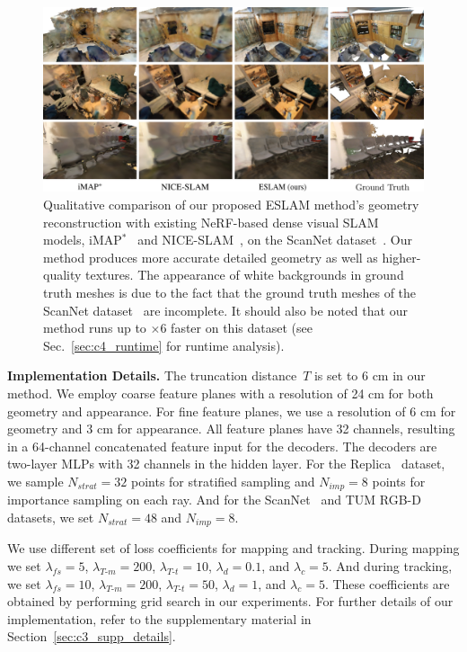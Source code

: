 \begin{figure}[t]
    \begin{center}
        \includegraphics[width=1.0\linewidth]{images/chapter4/figures/Fig5.jpg}
    \end{center}
    \caption{Qualitative comparison of our proposed ESLAM method's geometry reconstruction with existing NeRF-based dense visual SLAM models, iMAP$^*$~\citep{sucar2021imap} and NICE-SLAM~\citep{zhu2022nice}, on the ScanNet dataset~\citep{dai2017scannet}. Our method produces more accurate detailed geometry as well as higher-quality textures. The appearance of white backgrounds in ground truth meshes is due to the fact that the ground truth meshes of the ScanNet dataset~\citep{dai2017scannet} are incomplete. It should also be noted that our method runs up to $\times$6 faster on this dataset (see Sec.~\ref{sec:c4_runtime} for runtime analysis).}
    \label{fig:c4_qualitative_scannet}
\end{figure}

\vspace{1ex}
\noindent\textbf{Implementation Details.} The truncation distance~$T$ is set to 6 cm in our method. We employ coarse feature planes with a resolution of 24 cm for both geometry and appearance. For fine feature planes, we use a resolution of 6 cm for geometry and 3 cm for appearance. All feature planes have 32 channels, resulting in a 64-channel concatenated feature input for the decoders. The decoders are two-layer MLPs with 32 channels in the hidden layer. For the Replica~\citep{replica19arxiv} dataset, we sample $N_{strat}=32$ points for stratified sampling and $N_{imp}=8$ points for importance sampling on each ray. And for the ScanNet~\citep{dai2017scannet} and TUM RGB-D~\citep{sturm2012benchmark} datasets, we set $N_{strat}=48$ and $N_{imp}=8$.

We use different set of loss coefficients for mapping and tracking. During mapping we set $\lambda_{fs}=5$, $\lambda_{T\text{-}m}=200$, $\lambda_{T\text{-}t}=10$, $\lambda_{d}=0.1$, and $\lambda_{c}=5$. And during tracking, we set $\lambda_{fs}=10$, $\lambda_{T\text{-}m}=200$, $\lambda_{T\text{-}t}=50$, $\lambda_{d}=1$, and $\lambda_{c}=5$. These coefficients are obtained by performing grid search in our experiments. For further details of our implementation, refer to the supplementary material in Section~\ref{sec:c3_supp_details}.

